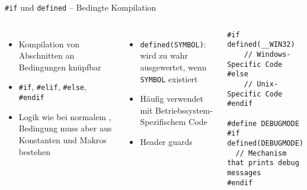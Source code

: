 
\begin{frame}[fragile]{\texttt{\#if} und \texttt{defined} -- Bedingte Kompilation}
%
\begin{columns}[T]
\begin{itemize}
\item Kompilation von Abschnitten an Bedingungen knüpfbar
\item \texttt{#if}, \texttt{#elif}, \texttt{#else}, \texttt{#endif}
\item Logik wie bei normalem , Bedingung muss aber aus Konstanten und Makros bestehen
\end{itemize}
%
\begin{itemize}
\item \texttt{defined(SYMBOL)}: wird zu wahr ausgewertet, wenn \texttt{SYMBOL} existiert
\item Häufig verwendet mit Betriebssystem-Spezifischem Code
\item Header guards
\end{itemize}
%
\begin{codebox}
\begin{verbatim}
#if defined(__WIN32)
    // Windows-Specific Code
#else
    // Unix-Specific Code
#endif

#define DEBUGMODE
#if defined(DEBUGMODE)
  // Mechanism that prints debug messages
#endif
\end{verbatim}
\end{codebox}
\end{columns}
%
\end{frame}



